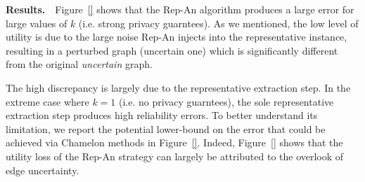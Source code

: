 \textbf{Results.}~~Figure~\ref{} shows that the Rep-An algorithm produces a large error for large values of $k$ (i.e. strong privacy guarntees). As we mentioned, the low level of utility is due to the large noise Rep-An injects into the representative instance, resulting in a perturbed graph (uncertain one) which is significantly different from the original \emph{uncertain} graph. 

The high discrepancy is largely due to the representative extraction step. In the extreme case where $k=1$ (i.e. no privacy guarntees), the sole representative extraction step produces high reliability errors. 
To better understand its limitation, we report the potential lower-bound on the error that could be achieved via Chamelon methods in Figure~\ref{}. Indeed, Figure~\ref{} shows that the utility loss of the Rep-An strategy can largely be attributed to the overlook of edge uncertainty.   




